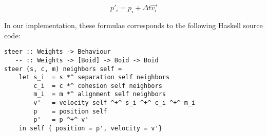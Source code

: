 \[ p\prime_i = p_i + \Delta t\vec{v_i}\]

In our implementation, these formulae corresponds to the following Haskell source code:

\begin{verbatim}
steer :: Weights -> Behaviour
   -- :: Weights -> [Boid] -> Boid -> Boid
steer (s, c, m) neighbors self =
    let s_i  = s *^ separation self neighbors
        c_i  = c *^ cohesion self neighbors
        m_i  = m *^ alignment self neighbors
        v'   = velocity self ^+^ s_i ^+^ c_i ^+^ m_i
        p    = position self
        p'   = p ^+^ v'
    in self { position = p', velocity = v'}
\end{verbatim}

\vfill
\pagebreak

 
 

